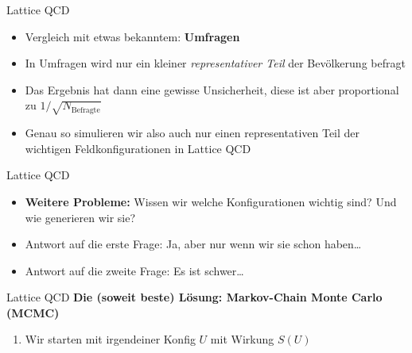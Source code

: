 \documentclass[
  ignorenonframetext,
  ngerman,
]{beamer}
\providecommand{\tightlist}{%
  \setlength{\itemsep}{0pt}\setlength{\parskip}{0pt}}
\begin{document}
\begin{frame}{Lattice QCD}
\label{lattice-qcd-1}
\begin{itemize}
\tightlist
\item
  Vergleich mit etwas bekanntem: \textbf{Umfragen}
\end{itemize}

\pause

\begin{itemize}
\tightlist
\item
  In Umfragen wird nur ein kleiner \emph{representativer Teil} der
  Bevölkerung befragt
\item
  Das Ergebnis hat dann eine gewisse Unsicherheit, diese ist aber
  proportional zu \(1 / \sqrt{N_\textrm{Befragte}}\)
\end{itemize}

\begin{itemize}
\tightlist
\item
  Genau so simulieren wir also auch nur einen representativen Teil der
  wichtigen Feldkonfigurationen in Lattice QCD
\end{itemize}
\end{frame}

\begin{frame}{Lattice QCD}
\label{lattice-qcd-2}
\begin{itemize}
\tightlist
\item
  \textbf{Weitere Probleme:} Wissen wir welche Konfigurationen wichtig
  sind? Und wie generieren wir sie?
\end{itemize}

\begin{itemize}
\tightlist
\item
  Antwort auf die erste Frage: Ja, aber nur wenn wir sie schon
  haben\ldots{}
\end{itemize}

\begin{itemize}
\tightlist
\item
  Antwort auf die zweite Frage: Es ist schwer\ldots{}
\end{itemize}
\end{frame}

\begin{frame}{Lattice QCD}
\label{lattice-qcd-3}
\textbf{Die (soweit beste) Lösung: Markov-Chain Monte Carlo (MCMC)}

\begin{enumerate}
\tightlist
\item
  Wir starten mit irgendeiner Konfig \(U\) mit Wirkung \(S(U)\)
\end{enumerate}
\end{frame}
\end{document}
